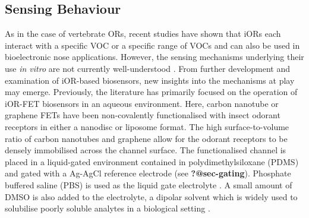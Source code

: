\documentclass[
  a4paper,
]{scrbook}
\begin{document}
\hypertarget{sensing-behaviour}{%
\subsection{Sensing Behaviour}\label{sensing-behaviour}}

As in the case of vertebrate ORs, recent studies have shown that iORs
each interact with a specific VOC or a specific range of VOCs and can
also be used in bioelectronic nose applications. However, the sensing
mechanisms underlying their use \emph{in vitro} are not currently
well-understood \autocite{Murugathas2019a,Murugathas2020,Khadka2019}.
From further development and examination of iOR-based biosensors, new
insights into the mechanisms at play may emerge. Previously, the
literature has primarily focused on the operation of iOR-FET biosensors
in an aqueous environment. Here, carbon nanotube or graphene FETs have
been non-covalently functionalised with insect odorant receptors in
either a nanodisc or liposome format. The high surface-to-volume ratio
of carbon nanotubes and graphene allow for the odorant receptors to be
densely immobilised across the channel surface. The functionalised
channel is placed in a liquid-gated environment contained in
polydimethylsiloxane (PDMS) and gated with a Ag-AgCl reference electrode
(see \textbf{?@sec-gating}). Phosphate buffered saline (PBS) is used as
the liquid gate electrolyte \autocite{Murugathas2019a,Murugathas2020}. A
small amount of DMSO is also added to the electrolyte, a dipolar solvent
which is widely used to solubilise poorly soluble analytes in a
biological setting \autocite{Galvao2014}.
\end{document}
